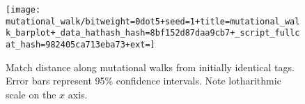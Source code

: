 \begin{figure}
\begin{center}

\texttt{[image: mutational\_walk/bitweight=0dot5+seed=1+title=mutational\_walk\_barplot+\_data\_hathash\_hash=8bf152d87daa9cb7+\_script\_fullcat\_hash=982405ca713eba73+ext=]}
\caption{
Match distance along mutational walks from initially identical tags.
Error bars represent 95\% confidence intervals.
Note lotharithmic scale on the $x$ axis.
}
\label{fig:mutational_walk_barplot}

\end{center}
\end{figure}
